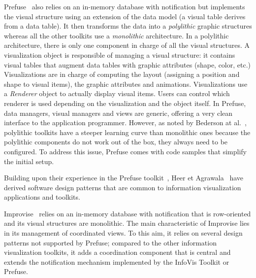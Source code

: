 Prefuse~\cite{Prefuse} also relies on an in-memory database with
notification but implements the visual structure using an extension of
the data model (a visual table derives from a data table).  It then
transforms the data into a \emph{polylithic} graphic structures
whereas all the other toolkits use a \emph{monolithic} architecture.
In a polylithic architecture, there is only one component in charge of
all the visual structures.  A visualization object is responsible of
managing a visual structure: it contains visual tables that augment
data tables with graphic attributes (shape, color, etc.)
Visualizations are in charge of computing the layout (assigning a
position and shape to visual items), the graphic attributes and
animations.  Visualizations use a \emph{Renderer} object to actually
display visual items.  Users can control which renderer is used
depending on the visualization and the object itself.  In Prefuse,
data managers, visual managers and views are generic, offering a very
clean interface to the application programmer.  However, as noted by
Bederson at al.~\cite{Polylithic}, polylithic toolkits have a steeper
learning curve than monolithic ones because the polylithic components
do not work out of the box, they always need to be configured.  To
address this issue, Prefuse comes with code samples that simplify the
initial setup.

Building upon their experience in the Prefuse toolkit~\cite{Prefuse},
Heer et Agrawala~\cite{DesignPatternsIV} have derived software design
patterns that are common to information visualization applications and
toolkits. 

Improvise~\cite{Improvise} relies on an in-memory database with
notification that is row-oriented and its visual structures are
monolithic.  The main characteristic of Improvise lies in its
management of coordinated views.  To this aim, it relies on several
design patterns not supported by Prefuse; compared to the other
information visualization toolkits, it adds a coordination component
that is central and extends the notification mechanism implemented
by the InfoVis Toolkit or Prefuse.


